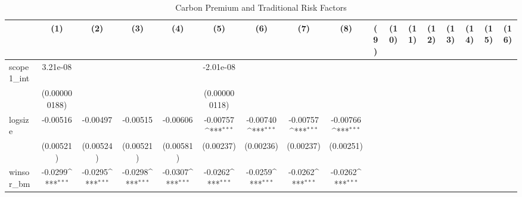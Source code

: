 \begin{table}[htbp]\centering
\def\sym#1{\ifmmode^{#1}\else\(^{#1}\)\fi}
\caption{Carbon Premium and Traditional Risk Factors}
\begin{tabular}{l*{16}{c}}
\hline\hline
                    &\multicolumn{1}{c}{(1)}         &\multicolumn{1}{c}{(2)}         &\multicolumn{1}{c}{(3)}         &\multicolumn{1}{c}{(4)}         &\multicolumn{1}{c}{(5)}         &\multicolumn{1}{c}{(6)}         &\multicolumn{1}{c}{(7)}         &\multicolumn{1}{c}{(8)}         &\multicolumn{1}{c}{(9)}         &\multicolumn{1}{c}{(10)}         &\multicolumn{1}{c}{(11)}         &\multicolumn{1}{c}{(12)}         &\multicolumn{1}{c}{(13)}         &\multicolumn{1}{c}{(14)}         &\multicolumn{1}{c}{(15)}         &\multicolumn{1}{c}{(16)}         \\
\hline
scope1\_int          &    3.21e-08         &                     &                     &                     &   -2.01e-08         &                     &                     &                     &                     &                     &                     &                     &                     &                     &                     &                     \\
                    &(0.000000188)         &                     &                     &                     &(0.000000118)         &                     &                     &                     &                     &                     &                     &                     &                     &                     &                     &                     \\
[1em]
logsize             &    -0.00516         &    -0.00497         &    -0.00515         &    -0.00606         &    -0.00757\sym{***}&    -0.00740\sym{***}&    -0.00757\sym{***}&    -0.00766\sym{***}&                     &                     &                     &                     &                     &                     &                     &                     \\
                    &   (0.00521)         &   (0.00524)         &   (0.00521)         &   (0.00581)         &   (0.00237)         &   (0.00236)         &   (0.00237)         &   (0.00251)         &                     &                     &                     &                     &                     &                     &                     &                     \\
[1em]
winsor\_bm           &     -0.0299\sym{***}&     -0.0295\sym{***}&     -0.0298\sym{***}&     -0.0307\sym{***}&     -0.0262\sym{***}&     -0.0259\sym{***}&     -0.0262\sym{***}&     -0.0262\sym{***}&                     &                     &                     &                     &                     &                     &                     &                     \\

\end{tabular}
\end{table}
